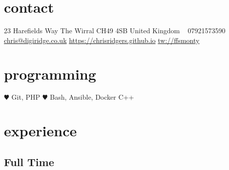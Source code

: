 \documentclass[]{friggeri-cv} %
\begin{document}


\begin{aside} %
\section{contact}
23 Harefields Way
The Wirral
CH49 4SB
United Kingdom
~
07921573590
~
\href{mailto:chris@digiridge.co.uk}{chris@digiridge.co.uk}
\href{https://chrisridgers.github.io}{https://chrisridgers.github.io}
\href{http://twitter.com/ffsmonty}{tw://ffsmonty}
\section{programming}
{\large \color{red} $\varheartsuit$} Git, PHP
{\color{red} $\varheartsuit$} Bash, Ansible, Docker
C++
\end{aside}


\section{experience}

\subsection{Full Time}
\end{document}
